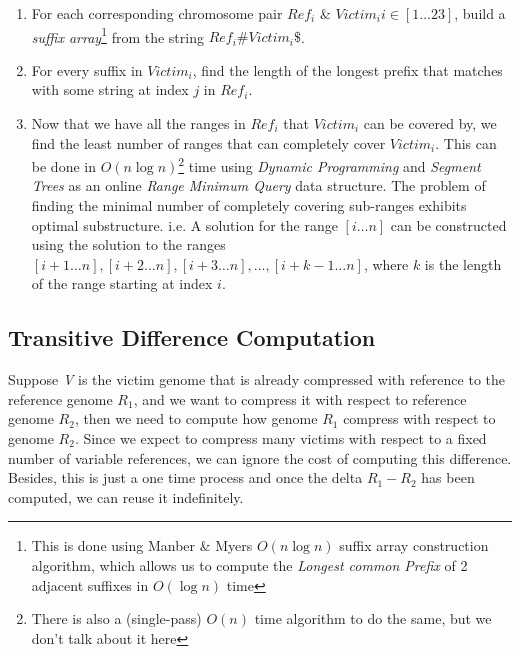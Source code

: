 \documentclass[11pt]{article}
\begin{document}
\begin{enumerate}

\item For each corresponding chromosome pair ${Ref}_i$ \& $Victim_i i
  \in [1\ldots{}23]$, build a
  \textit{suffix array}\footnote{This is done using Manber \& Myers
    $O(n\log{n})$ suffix array construction
    algorithm\cite{manbermyers}, which allows us to compute the
    \textit{Longest common Prefix} of 2 adjacent suffixes in
    $O(\log{n})$ time} from the string $Ref_i\#Victim_i\$$.

\item For every suffix in ${Victim}_i$, find the length of the longest
  prefix that matches with some string at index $j$ in ${Ref}_i$.

\item Now that we have all the ranges in $Ref_i$ that $Victim_i$ can
  be covered by, we find the least number of ranges that can
  completely cover $Victim_i$. This can be done in
  $O(n\log{n})$\footnote{There is also a (single-pass) $O(n)$
    time algorithm to do the same, but we don't talk about it here}
  time using \textit{Dynamic Programming} and \textit{Segment Trees}
  as an online \textit{Range Minimum Query} data structure. The
  problem of finding the minimal number of completely covering
  sub-ranges exhibits optimal substructure. i.e. A solution for the
  range $[i\ldots{}n]$ can be constructed using the solution to the
  ranges $[i+1\ldots{}n], [i+2\ldots{}n], [i+3\ldots{}n], \ldots{},
  [i+k-1\ldots{}n]$, where $k$ is the length of the range starting at
  index $i$.

\end{enumerate}

\subsection{Transitive Difference Computation}

Suppose \textit{V} is the victim genome that is already compressed
with reference to the reference genome \textit{$R_1$}, and we want to
compress it with respect to reference genome \textit{$R_2$}, then we
need to compute how genome \textit{$R_1$} compress with respect to
genome \textit{$R_2$}. Since we expect to compress many victims with
respect to a fixed number of variable references, we can ignore the
cost of computing this difference. Besides, this is just a one time
process and once the delta \textit{$R_1 - R_2$} has been computed, we
can reuse it indefinitely.
\end{document}
